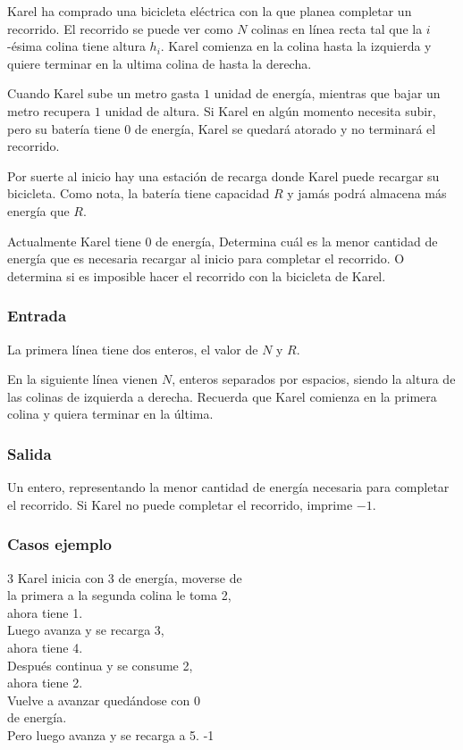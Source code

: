 \label{bicicleta}

Karel ha comprado una bicicleta eléctrica con la que planea completar un recorrido. El recorrido se puede ver como \(N\) colinas en línea recta tal que la \(i\)-ésima colina tiene altura \(h_i\). Karel comienza en la colina hasta la izquierda y quiere terminar en la ultima colina de hasta la derecha.

Cuando Karel sube un metro gasta \(1\) unidad de energía, mientras que bajar un metro recupera \(1\) unidad de altura. Si Karel en algún momento necesita subir, pero su batería tiene 0 de energía, Karel se quedará atorado y no terminará el recorrido.

Por suerte al inicio hay una estación de recarga donde Karel puede recargar su bicicleta. Como nota, la batería tiene capacidad \(R\) y jamás podrá almacena más energía que \(R\).

Actualmente Karel tiene \(0\) de energía, Determina cuál es la menor cantidad de energía que es necesaria recargar al inicio para completar el recorrido. O determina si es imposible hacer el recorrido con la bicicleta de Karel.

\subsubsection*{Entrada}
La primera línea tiene dos enteros, el valor de \(N\) y \(R\).

En la siguiente línea vienen \(N\), enteros separados por espacios, siendo la altura de las colinas de izquierda a derecha. Recuerda que Karel comienza en la primera colina y quiera terminar en la última.
\subsubsection*{Salida}
Un entero, representando la menor cantidad de energía necesaria para completar el recorrido. Si Karel no puede completar el recorrido, imprime \(-1\).

\subsubsection*{Casos ejemplo}
\begin{casebox3}	
	{3}
	{
		Karel inicia con 3 de energía, moverse de   \\
		la primera a la segunda colina le toma 2,  \\
		ahora tiene 1.\\
		Luego avanza y se recarga 3,\\
		ahora tiene 4.\\
		Después continua y se consume 2,\\
		ahora tiene 2.\\		
		Vuelve a avanzar quedándose con 0\\
		de energía. \\		
		Pero luego avanza y se recarga a 5. 
	}
	{-1}
	{}
	\hline
\end{casebox3}	

